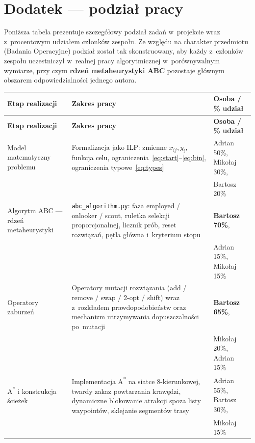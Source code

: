 \section{Dodatek --- podział pracy}
\label{sec:dodatek}

\noindent
Poniższa tabela prezentuje szczegółowy podział zadań w~projekcie wraz
z~procentowym udziałem członków zespołu. Ze względu na charakter
przedmiotu (Badania Operacyjne) podział został tak skonstruowany, aby
każdy z~członków zespołu uczestniczył w~realnej pracy algorytmicznej
w~porównywalnym wymiarze, przy czym \textbf{rdzeń metaheurystyki ABC}
pozostaje głównym obszarem odpowiedzialności jednego autora.

\begin{longtable}{p{4.4cm} p{5.6cm} p{4.4cm}}
\toprule
\textbf{Etap realizacji} & \textbf{Zakres pracy} & \textbf{Osoba / \% udział} \\
\midrule
\endfirsthead

\toprule
\textbf{Etap realizacji} & \textbf{Zakres pracy} & \textbf{Osoba / \% udział} \\
\midrule
\endhead

Model matematyczny problemu
& Formalizacja jako ILP: zmienne $x_{ij}, y_i$, funkcja celu,
  ograniczenia~\eqref{eq:start}--\eqref{eq:bin}, ograniczenia
  typowe~\eqref{eq:types}
& Adrian 50\%, Mikołaj 30\%, \\[-2pt]
& & Bartosz 20\% \\[4pt]

Algorytm ABC --- rdzeń metaheurystyki
& \texttt{abc\_algorithm.py}: faza employed / onlooker / scout, ruletka
  selekcji proporcjonalnej, licznik prób, reset rozwiązań,
  pętla główna i~kryterium stopu
& \textbf{Bartosz 70\%}, \\[-2pt]
& & Adrian 15\%, Mikołaj 15\% \\[4pt]

Operatory zaburzeń
& Operatory mutacji rozwiązania (add / remove / swap / 2-opt / shift)
  wraz z~rozkładem prawdopodobieństw oraz mechanizm utrzymywania
  dopuszczalności po~mutacji
& \textbf{Bartosz 65\%}, \\[-2pt]
& & Mikołaj 20\%, Adrian 15\% \\[4pt]

A\textsuperscript{*} i konstrukcja ścieżek
& Implementacja A\textsuperscript{*} na siatce 8-kierunkowej, twardy
  zakaz powtarzania krawędzi, dynamiczne blokowanie atrakcji
  spoza listy waypointów, sklejanie segmentów trasy
& Adrian 55\%, Bartosz 30\%, \\[-2pt]
& & Mikołaj 15\% \\[4pt]


\end{longtable}
